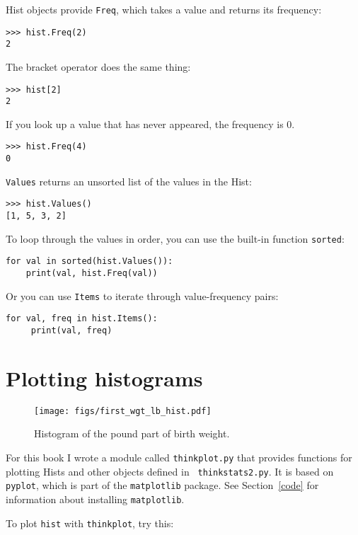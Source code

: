 \documentclass[12pt]{book}
\begin{document}
Hist objects provide {\tt Freq}, which takes a value and
returns its frequency: 
%
\begin{verbatim}
>>> hist.Freq(2)
2
\end{verbatim}

The bracket operator does the same thing: 
%
\begin{verbatim}
>>> hist[2]
2
\end{verbatim}

If you look up a value that has never appeared, the frequency is 0.
%
\begin{verbatim}
>>> hist.Freq(4)
0
\end{verbatim}

{\tt Values} returns an unsorted list of the values in the Hist:
%
\begin{verbatim}
>>> hist.Values()
[1, 5, 3, 2]
\end{verbatim}

To loop through the values in order, you can use the built-in function
{\tt sorted}:
%
\begin{verbatim}
for val in sorted(hist.Values()):
    print(val, hist.Freq(val))
\end{verbatim}

Or you can use {\tt Items} to iterate through
value-frequency pairs: 
%
\begin{verbatim}
for val, freq in hist.Items():
     print(val, freq)
\end{verbatim}


\section{Plotting histograms}

\begin{figure}
\centerline{\texttt{[image: figs/first\_wgt\_lb\_hist.pdf]}}
\caption{Histogram of the pound part of birth weight.}
\label{first_wgt_lb_hist}
\end{figure}

For this book I wrote a module called {\tt thinkplot.py} that provides
functions for plotting Hists and other objects defined in {\tt
  thinkstats2.py}.  It is based on {\tt pyplot}, which is part of the
{\tt matplotlib} package.  See Section~\ref{code} for information
about installing {\tt matplotlib}.  

To plot {\tt hist} with {\tt thinkplot}, try this:
\end{document}
